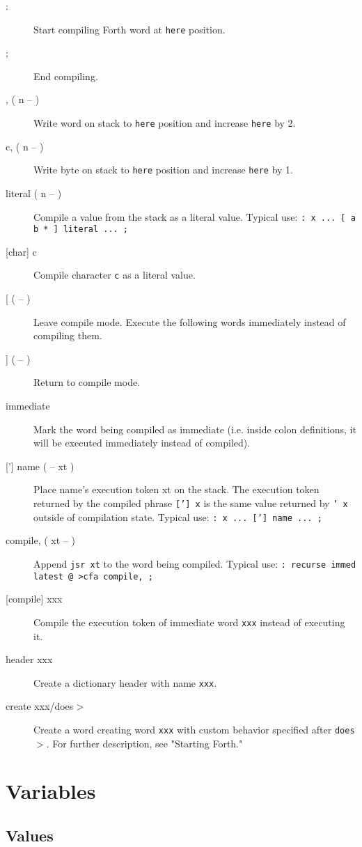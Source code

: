 \begin{description}
\item[:] Start compiling Forth word at \texttt{here} position.
\item[;] End compiling.
\item[, ( n -- )] Write word on stack to \texttt{here} position and increase \texttt{here} by 2.
\item[c, ( n -- )] Write byte on stack to \texttt{here} position and increase \texttt{here} by 1.
\item[literal ( n -- )] Compile a value from the stack as a literal value. Typical use: \texttt{: x ... [ a b * ] literal ... ;}
\item[[char{]} c] Compile character \texttt{c} as a literal value.
\item[[ ( -- )] Leave compile mode. Execute the following words immediately instead of compiling them.
\item[{]} ( -- )] Return to compile mode.
\item[immediate] Mark the word being compiled as immediate (i.e. inside colon definitions, it will be executed immediately instead of compiled).
\item[{[']} name ( -- xt )] Place name's execution token xt on the stack. The execution token returned by the compiled phrase \texttt{['] x} is the same value returned by \texttt{' x} outside of compilation state. Typical use: \texttt{: x ... {[}'{]} name ... ;}
\item[compile, ( xt -- )] Append \texttt{jsr xt} to the word being compiled. Typical use: \texttt{: recurse immed latest @ >cfa compile, ;}
\item[[compile{]} xxx] Compile the execution token of immediate word \texttt{xxx} instead of executing it.
\item[header xxx] Create a dictionary header with name \texttt{xxx}. 
\item[create xxx/does$>$] Create a word creating word \texttt{xxx} with custom behavior
specified after \texttt{does$>$}. For further description, see "Starting Forth."

\end{description}

\section{Variables}

\subsection{Values}

